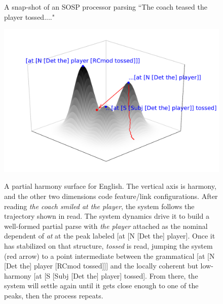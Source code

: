 \documentclass[10pt,letterpaper]{article}
\begin{document}
\begin{figure}
   \label{1stTreeletFigure}
   \caption{A snap-shot of an SOSP processor parsing ``The coach teased the player tossed...."} 
\end{figure}

\begin{figure}[h!]
\includegraphics[width=\linewidth]{../Figures/ToyHarmonySurface.pdf}
\label{IllustrativePotentialSurface}
\caption{A partial harmony surface for English. The vertical axis is harmony, and the other two dimensions code feature/link configurations. After reading \emph{the coach smiled at the player}, the system follows the trajectory shown in read. The system dynamics drive it to build a well-formed partial parse with \emph{the player} attached as the nominal dependent of \emph{at} at the peak labeled [at [N [Det the] player]. Once it has stabilized on that structure, \emph{tossed} is read, jumping the system (red arrow) to a point intermediate between the grammatical [at [N [Det the] player [RCmod tossed]]] and the locally coherent but low-harmony [at [S [Subj [Det the] player] tossed]. From there, the system will settle again until it gets close enough to one of the peaks, then the process repeats.} 
\end{figure}

\end{document}
